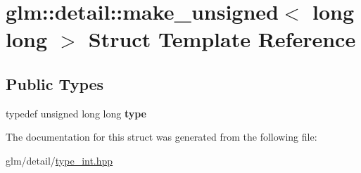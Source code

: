 \hypertarget{structglm_1_1detail_1_1make__unsigned_3_01long_01long_01_4}{\section{glm\-:\-:detail\-:\-:make\-\_\-unsigned$<$ long long $>$ Struct Template Reference}
\label{structglm_1_1detail_1_1make__unsigned_3_01long_01long_01_4}
}
\subsection*{Public Types}
\begin{DoxyCompactItemize}
\item 
\hypertarget{structglm_1_1detail_1_1make__unsigned_3_01long_01long_01_4_adb9a738bcdd4b53058383168bb8585b1}{typedef unsigned long long {\bfseries type}}\label{structglm_1_1detail_1_1make__unsigned_3_01long_01long_01_4_adb9a738bcdd4b53058383168bb8585b1}

\end{DoxyCompactItemize}


The documentation for this struct was generated from the following file\-:\begin{DoxyCompactItemize}
\item 
glm/detail/\hyperlink{type__int_8hpp}{type\-\_\-int.\-hpp}\end{DoxyCompactItemize}

